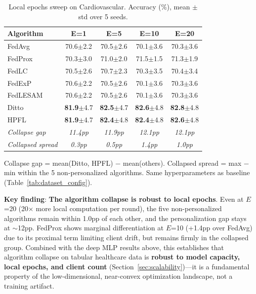 \documentclass[conference]{IEEEtran}
\begin{document}
\begin{table}[htbp]
\centering
\caption{Local epochs sweep on Cardiovascular. Accuracy (\%), mean $\pm$ std over 5 seeds.}
\label{tab:epochs_sweep}
\small
\begin{tabular}{lcccc}
\toprule
\textbf{Algorithm} & \textbf{E=1} & \textbf{E=5} & \textbf{E=10} & \textbf{E=20} \\
\midrule
FedAvg & 70.6{\tiny$\pm$2.2} & 70.5{\tiny$\pm$2.6} & 70.1{\tiny$\pm$3.6} & 70.3{\tiny$\pm$3.6} \\
FedProx & 70.3{\tiny$\pm$3.0} & 71.0{\tiny$\pm$2.0} & 71.5{\tiny$\pm$1.5} & 71.3{\tiny$\pm$1.9} \\
FedLC & 70.5{\tiny$\pm$2.6} & 70.7{\tiny$\pm$2.3} & 70.3{\tiny$\pm$3.5} & 70.4{\tiny$\pm$3.4} \\
FedExP & 70.6{\tiny$\pm$2.2} & 70.5{\tiny$\pm$2.6} & 70.1{\tiny$\pm$3.6} & 70.3{\tiny$\pm$3.6} \\
FedLESAM & 70.6{\tiny$\pm$2.2} & 70.5{\tiny$\pm$2.6} & 70.1{\tiny$\pm$3.6} & 70.3{\tiny$\pm$3.6} \\
\midrule
Ditto & \textbf{81.9}{\tiny$\pm$4.7} & \textbf{82.5}{\tiny$\pm$4.7} & \textbf{82.6}{\tiny$\pm$4.8} & \textbf{82.8}{\tiny$\pm$4.8} \\
HPFL & \textbf{81.9}{\tiny$\pm$4.7} & \textbf{82.4}{\tiny$\pm$4.8} & \textbf{82.4}{\tiny$\pm$4.8} & \textbf{82.6}{\tiny$\pm$4.8} \\
\midrule
\textit{Collapse gap} & \textit{11.4pp} & \textit{11.9pp} & \textit{12.1pp} & \textit{12.1pp} \\
\textit{Collapsed spread} & \textit{0.3pp} & \textit{0.5pp} & \textit{1.4pp} & \textit{1.0pp} \\
\bottomrule
\end{tabular}

\vspace{1mm}
\footnotesize{Collapse gap = mean(Ditto, HPFL) $-$ mean(others). Collapsed spread = max $-$ min within the 5 non-personalized algorithms. Same hyperparameters as baseline (Table~\ref{tab:dataset_config}).}
\end{table}

\textbf{Key finding}: \textbf{The algorithm collapse is robust to local epochs}. Even at $E$=20 (20$\times$ more local computation per round), the five non-personalized algorithms remain within 1.0pp of each other, and the personalization gap stays at $\sim$12pp. FedProx shows marginal differentiation at $E$=10 (+1.4pp over FedAvg) due to its proximal term limiting client drift, but remains firmly in the collapsed group. Combined with the deep MLP results above, this establishes that algorithm collapse on tabular healthcare data is \textbf{robust to model capacity, local epochs, and client count} (Section~\ref{sec:scalability})---it is a fundamental property of the low-dimensional, near-convex optimization landscape, not a training artifact.
\end{document}
